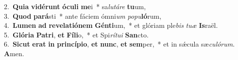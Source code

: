 {2.~}\textbf{Qui}\textbf{a} \textbf{vi}\textbf{dé}\textbf{runt} \textbf{ó}\textbf{cu}\textbf{li} \textbf{me}i~* sa\textit{lu}\textit{tá}\textit{re} \textbf{tu}um,\\
{3.~}\textbf{Quod} \textbf{pa}\textbf{rá}sti~* ante fáciem ómni\textit{um} \textit{po}\textit{pu}\textbf{ló}rum,\\
{4.~}\textbf{Lu}\textbf{men} \textbf{ad} \textbf{re}\textbf{ve}\textbf{la}\textbf{ti}\textbf{ó}\textbf{nem} \textbf{Gén}\textbf{ti}um,~* et glóriam ple\textit{bis} \textit{tu}\textit{æ} \textbf{Is}raël.\\
{5.~}\textbf{Gló}\textbf{ri}\textbf{a} \textbf{Pa}\textbf{tri}, \textbf{et} \textbf{Fí}\textbf{li}o,~* et Spi\textit{rí}\textit{tu}\textit{i} \textbf{San}cto.\\
{6.~}\textbf{Si}\textbf{cut} \textbf{e}\textbf{rat} \textbf{in} \textbf{prin}\textbf{cí}\textbf{pi}\textbf{o}, \textbf{et} \textbf{nunc}, \textbf{et} \textbf{sem}per,~* et in sǽcula sæ\textit{cu}\textit{ló}\textit{rum}. \textbf{A}men.\\
